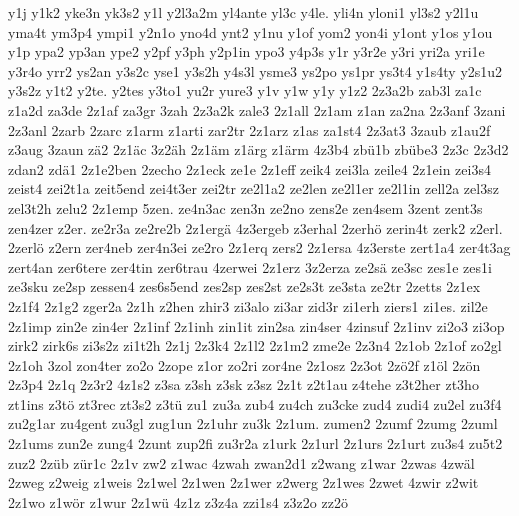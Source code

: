 {y1j
y1k2
yke3n
yk3s2
y1l
y2l3a2m
yl4ante
yl3c
y4le.
yli4n
yloni1
yl3s2
y2l1u
yma4t
ym3p4
ympi1
y2n1o
yno4d
ynt2
y1nu
y1of
yom2
yon4i
y1ont
y1os
y1ou
y1p
ypa2
yp3an
ype2
y2pf
y3ph
y2p1in
ypo3
y4p3s
y1r
y3r2e
y3ri
yri2a
yri1e
y3r4o
yrr2
ys2an
y3s2c
yse1
y3s2h
y4s3l
ysme3
ys2po
ys1pr
ys3t4
y1s4ty
y2s1u2
y3s2z
y1t2
y2te.
y2tes
y3to1
yu2r
yure3
y1v
y1w
y1y
y1z2
2z3a2b
zab3l
za1c
z1a2d
za3de
2z1af
za3gr
3zah
2z3a2k
zale3
2z1all
2z1am
z1an
za2na
2z3anf
3zani
2z3anl
2zarb
2zarc
z1arm
z1arti
zar2tr
2z1arz
z1as
za1st4
2z3at3
3zaub
z1au2f
z3aug
3zaun
zä2
2z1äc
3z2äh
2z1äm
z1ärg
z1ärm
4z3b4
zbü1b
zbübe3
2z3c
2z3d2
zdan2
zdä1
2z1e2ben
2zecho
2z1eck
ze1e
2z1eff
zeik4
zei3la
zeile4
2z1ein
zei3s4
zeist4
zei2t1a
zeit5end
zei4t3er
zei2tr
ze2l1a2
ze2len
ze2l1er
ze2l1in
zell2a
zel3sz
zel3t2h
zelu2
2z1emp
5zen.
ze4n3ac
zen3n
ze2no
zens2e
zen4sem
3zent
zent3s
zen4zer
z2er.
ze2r3a
ze2re2b
2z1ergä
4z3ergeb
z3erhal
2zerhö
zerin4t
zerk2
z2erl.
2zerlö
z2ern
zer4neb
zer4n3ei
ze2ro
2z1erq
zers2
2z1ersa
4z3erste
zert1a4
zer4t3ag
zert4an
zer6tere
zer4tin
zer6trau
4zerwei
2z1erz
3z2erza
ze2sä
ze3sc
zes1e
zes1i
ze3sku
ze2sp
zessen4
zes6s5end
zes2sp
zes2st
ze2s3t
ze3sta
ze2tr
2zetts
2z1ex
2z1f4
2z1g2
zger2a
2z1h
z2hen
zhir3
zi3alo
zi3ar
zid3r
zi1erh
ziers1
zi1es.
zil2e
2z1imp
zin2e
zin4er
2z1inf
2z1inh
zin1it
zin2sa
zin4ser
4zinsuf
2z1inv
zi2o3
zi3op
zirk2
zirk6s
zi3s2z
zi1t2h
2z1j
2z3k4
2z1l2
2z1m2
zme2e
2z3n4
2z1ob
2z1of
zo2gl
2z1oh
3zol
zon4ter
zo2o
2zope
z1or
zo2ri
zor4ne
2z1osz
2z3ot
2zö2f
z1öl
2zön
2z3p4
2z1q
2z3r2
4z1s2
z3sa
z3sh
z3sk
z3sz
2z1t
z2t1au
z4tehe
z3t2her
zt3ho
zt1ins
z3tö
zt3rec
zt3s2
z3tü
zu1
zu3a
zub4
zu4ch
zu3cke
zud4
zudi4
zu2el
zu3f4
zu2g1ar
zu4gent
zu3gl
zug1un
2z1uhr
zu3k
2z1um.
zumen2
2zumf
2zumg
2zuml
2z1ums
zun2e
zung4
2zunt
zup2fi
zu3r2a
z1urk
2z1url
2z1urs
2z1urt
zu3s4
zu5t2
zuz2
2züb
zür1c
2z1v
zw2
z1wac
4zwah
zwan2d1
z2wang
z1war
2zwas
4zwäl
2zweg
z2weig
z1weis
2z1wel
2z1wen
2z1wer
z2werg
2z1wes
2zwet
4zwir
z2wit
2z1wo
z1wör
z1wur
2z1wü
4z1z
z3z4a
zzi1s4
z3z2o
zz2ö
}

\endinput


